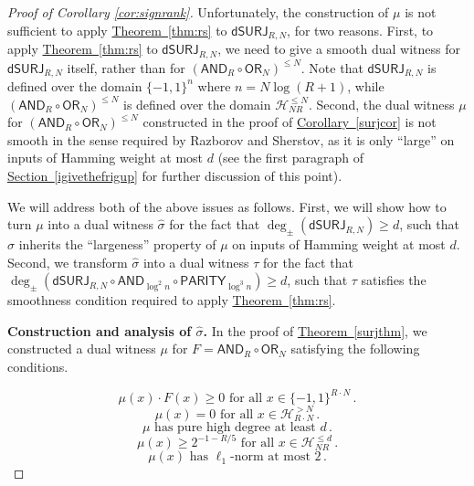 \documentclass[11pt]{article}
\numberwithin{equation}{section}
\theoremstyle{definition}
\theoremstyle{plain}
\newcommand{\expref}[2]{\hyperref[#2]{#1~\ref{#2}}}
\newcommand{\dumSURJ}{\mathsf{dSURJ}}
\newcommand{\OR}{\mathsf{ OR}}
\newcommand{\bits}{\{-1,1\}}
\newcommand{\AND}{\mathsf{AND}}
\newcommand{\PARITY}{\mathsf{PARITY}}
\begin{document}
\begin{proof}[Proof of Corollary \ref{cor:signrank}]
Unfortunately, the construction of 
$\mu$ is not sufficient to apply \expref{Theorem}{thm:rs} to $\dumSURJ_{R, N}$, for two reasons.
First, 
to apply \expref{Theorem}{thm:rs} to $\dumSURJ_{R, N}$, we need to give a smooth dual witness for $\dumSURJ_{R, N}$ itself, rather than for $\left(\AND_R \circ \OR_N\right)^{\leq N}$. Note that
$\dumSURJ_{R, N}$ is defined over the domain $\bits^n$ where $n=N \log(R+1)$, while $\left(\AND_R \circ \OR_N\right)^{\leq N}$ is defined over the domain $\mathcal{H}_{NR}^{\leq N}$. Second, the dual witness $\mu$ for  $\left(\AND_R \circ \OR_N\right)^{\leq N}$ constructed in the proof of \expref{Corollary}{surjcor}
is not smooth in the sense required by Razborov and Sherstov, as it is only ``large'' on inputs of Hamming weight at most $d$ (see the first paragraph of \expref{Section}{igivethefrigup}
for further discussion of this point). 


We will address both of the above issues as follows. First, we will show how to turn $\mu$ into a dual witness $\hat{\sigma}$
for the fact that $\deg_{\pm}\left(\dumSURJ_{R, N}\right)\geq d$, such that $\hat{\sigma}$ inherits the ``largeness'' property of $\mu$ on inputs of Hamming weight at most $d$. 
Second, we transform $\hat{\sigma}$ into a dual witness $\tau$ for the fact that $\deg_{\pm}\left(\dumSURJ_{R, N} \circ \AND_{\log^2 n} \circ \PARITY_{\log^3 n} \right)\geq d$, such
that $\tau$ satisfies the smoothness condition required to apply \expref{Theorem}{thm:rs}.

\medskip
\noindent \textbf{Construction and analysis of $\hat{\sigma}$.}
In the proof of \expref{Theorem}{surjthm}, we constructed a dual witness $\mu$ for $F=\AND_R \circ \OR_N$ satisfying the following 
conditions.

\begin{equation} \label{asdf1}
\mu(x) \cdot F(x) \geq 0 \text{ for all } x \in \bits^{R \cdot N}\,.
\end{equation}
\begin{equation} \label{asdf2}
\mu(x) = 0  \text{ for all } x \in \mathcal{H}^{> N}_{R \cdot N}\,.
\end{equation}
\begin{equation} \label{asdf3}
\mu \text{ has pure high degree at least } d\,.
\end{equation}
\begin{equation} \label{nomorelabelsbrah}
\mu(x) \geq 2^{-1-R/5} \text{ for all } x \in \mathcal{H}_{NR}^{\leq d}\,.
\end{equation}
\begin{equation} \label{asdf4}
\mu(x) \text{ has } \ell_1\text{-norm at most } 2\,.
\end{equation}


\end{proof}
\end{document}
